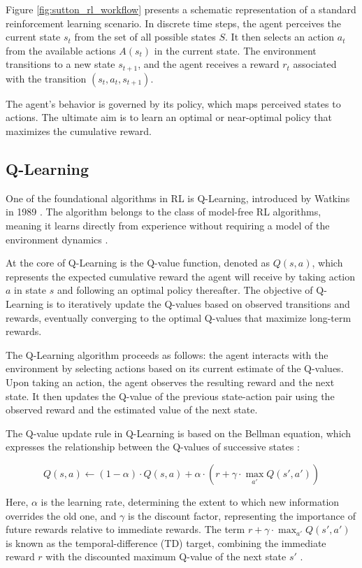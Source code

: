 Figure \ref{fig:sutton_rl_workflow} presents a schematic representation of a standard reinforcement learning scenario. In discrete time steps, the agent perceives the current state $s_t$ from the set of all possible states $S$. It then selects an action $a_t$ from the available actions $A(s_t)$ in the current state. The environment transitions to a new state $s_{t+1}$, and the agent receives a reward $r_t$ associated with the transition $(s_t, a_t, s_{t+1})$.

The agent's behavior is governed by its policy, which maps perceived states to actions. The ultimate aim is to learn an optimal or near-optimal policy that maximizes the cumulative reward. 


\subsection{Q-Learning}

One of the foundational algorithms in RL is Q-Learning, introduced by Watkins in 1989 \cite{watkins1989learning}. The algorithm belongs to the class of model-free RL algorithms, meaning it learns directly from experience without requiring a model of the environment dynamics \cite{russel2020ai}.

At the core of Q-Learning is the Q-value function, denoted as $Q(s, a)$, which represents the expected cumulative reward the agent will receive by taking action $a$ in state $s$ and following an optimal policy thereafter. The objective of Q-Learning is to iteratively update the Q-values based on observed transitions and rewards, eventually converging to the optimal Q-values that maximize long-term rewards.

The Q-Learning algorithm proceeds as follows: the agent interacts with the environment by selecting actions based on its current estimate of the Q-values. Upon taking an action, the agent observes the resulting reward and the next state. It then updates the Q-value of the previous state-action pair using the observed reward and the estimated value of the next state.

The Q-value update rule in Q-Learning is based on the Bellman equation, which expresses the relationship between the Q-values of successive states \cite{russel2020ai}:

\[
Q(s, a) \leftarrow (1 - \alpha) \cdot Q(s, a) + \alpha \cdot \left( r + \gamma \cdot \max_{a'} Q(s', a') \right)
\]

Here, $\alpha$ is the learning rate, determining the extent to which new information overrides the old one, and $\gamma$ is the discount factor, representing the importance of future rewards relative to immediate rewards. The term $r + \gamma \cdot \max_{a'} Q(s', a')$ is known as the temporal-difference (TD) target, combining the immediate reward $r$ with the discounted maximum Q-value of the next state $s'$ \cite{russel2020ai}.

